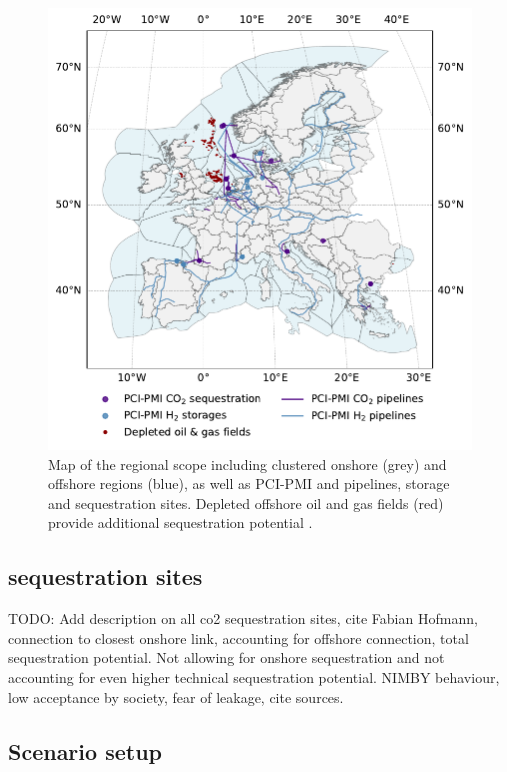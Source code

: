 \documentclass[preprint,12pt]{elsarticle}
\begin{document}
\begin{figure}[htbp]
  \centering
  \includegraphics[width=0.9\linewidth]{regional_scope_map}
  \caption{Map of the regional scope including clustered onshore (grey) and offshore regions (blue), as well as PCI-PMI  and  pipelines, storage and sequestration sites. Depleted offshore oil and gas fields (red) provide additional  sequestration potential \cite{hofmannH2CO2Network2025}.}
  \label{fig:regional_scope_map}
\end{figure}

\subsection{ sequestration sites}
\label{sec:co2_sequestration_sites}
TODO: Add description on all co2 sequestration sites, cite Fabian Hofmann, connection to closest onshore link, accounting for offshore connection, total sequestration potential. Not allowing for onshore sequestration and not accounting for even higher technical sequestration potential. NIMBY behaviour, low acceptance by society, fear of leakage, cite sources. 

\subsection{Scenario setup}
\label{sec:scenario_setup}
\end{document}
